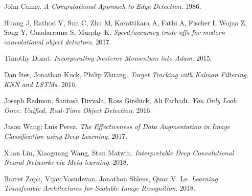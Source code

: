 \documentclass[12pt]{article}%
\begin{document}
\newpage
\begin{thebibliography}{9}
John Canny. 
\textit{A Computational Approach to Edge Detection}. 
1986.

Huang J, Rathod V, Sun C, Zhu M, Korattikara A, Fathi A, Fischer I, Wojna Z,
Song Y, Guadarrama S, Murphy K.
\textit{Speed/accuracy trade-offs for modern convolutional object detectors}.
2017.

Timothy Dozat.
\textit{Incorporating Nesterov Momentum into Adam}.
2015.
 
Dan Iter, Jonathan Kuck, Philip Zhuang.
\textit{Target Tracking with Kalman Filtering, KNN and LSTMs}.
2016.

Joseph Redmon, Santosh Divvala, Ross Girshick, Ali Farhadi.
\textit{You Only Look Once: Unified, Real-Time Object Detection}.
2016.
 
Jason Wang; Luis Perez.
\textit{The Effectiveness of Data Augmentation in Image Classification using Deep Learning}.
2017.
 
Xuan Liu, Xiaoguang Wang, Stan Matwin.
\textit{Interpretable Deep Convolutional Neural Networks via Meta-learning}.
2018.

Barret Zoph, Vijay Vasudevan, Jonathon Shlens, Quoc V. Le.
\textit{Learning Transferable Architectures for Scalable Image Recognition}.
2018.
\end{thebibliography}
\end{document}
